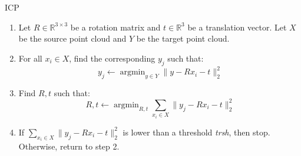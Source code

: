 \documentclass{beamer}
\DeclareMathOperator*{\argmin}{argmin}
\begin{document}
\begin{frame}{ICP}
\begin{enumerate}
    \item Let $R \in \mathbb{R}^{3\times 3}$ be a rotation matrix and $t \in \mathbb{R}^3$ be a translation vector. Let $X$ be the source point cloud and $Y$ be the target point cloud.
    \item For all $x_i \in X$, find the corresponding $y_j$ such that:
        \[
            y_j \gets \argmin_{y \in Y} \| y - R x_i - t\|_2^2
        \]
    \item Find $R,t$ such that:
        \[
            R,t \gets \argmin_{R,t} \sum_{x_i \in X} \|y_j - R x_i - t\|_2^2
        \]
    \item If $\sum_{x_i \in X} \| y_j - R x_i - t\|_2^2$ is lower than a threshold \textit{trsh}, then stop. Otherwise, return to step 2. 
\end{enumerate}
\end{frame}
\end{document}
